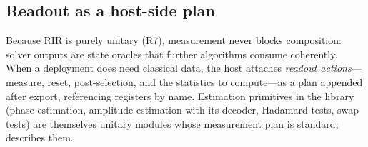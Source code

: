 \subsection{Readout as a host-side plan}
\label{sec:readout}

Because RIR is purely unitary (R7), measurement never blocks composition:
solver outputs are state oracles that further algorithms consume coherently.
When a deployment does need classical data, the host attaches
\emph{readout actions}---measure, reset, post-selection, and the statistics
to compute---as a plan appended after export, referencing registers by name.
Estimation primitives in the library (phase estimation, amplitude estimation
with its decoder, Hadamard tests, swap tests) are themselves unitary modules
whose measurement plan is standard;  describes them.
